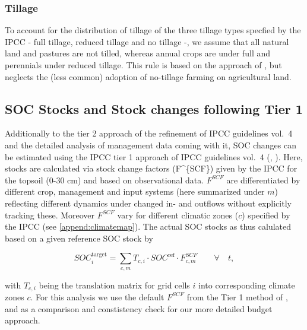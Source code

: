 \documentclass[gc, manuscript]{copernicus}
\begin{document}
\hypertarget{sec:tillage}{%
\subsubsection{Tillage}\label{sec:tillage}}

To account for the distribution of tillage of the three tillage types specfied by the IPCC - full tillage, reduced tillage and no tillage -, we assume that all natural land and pastures are not tilled, whereas annual crops are under full and perennials under reduced tillage. This rule is based on the approach of \citep{porwollik_generating_2018}, but neglects the (less common) adoption of no-tillage farming on agricultural land.

\newpage

\hypertarget{sec:tier1}{%
\subsection{SOC Stocks and Stock changes following Tier 1}\label{sec:tier1}}

Additionally to the tier 2 approach of the refinement of IPCC guidelines vol.~4 \citep{ipcc_2019_2019} and the detailed analysis of management data coming with it, SOC changes can be estimated using the IPCC tier 1 approach of IPCC guidelines vol.~4 (\citet{ipcc_2006_2006}, \citet{ipcc_2019_2019}). Here, stocks are calculated via stock change factors (F\^{}\{SCF\}) given by the IPCC for the topsoil (0-30 cm) and based on observational data. \(F^{SCF}\) are differentiated by different crop, management and input systems (here summarized under \(m\)) reflecting different dynamics under changed in- and outflows without explicitly tracking these. Moreover \(F^{SCF}\) vary for different climatic zones (\(c\)) specified by the IPCC (see \ref{append:climatemap}). The actual SOC stocks as thus calulated based on a given reference SOC stock by

\begin{equation}
SOC^{\text{target}}_{i} = \sum_{c,m} T_{c,i} \cdot SOC^{\text{ref}} \cdot F^{SCF}_{c,m} \qquad\forall\quad t,
\label{eq:tier1}
\end{equation}

with \(T_{c,i}\) being the translation matrix for grid cells \(i\) into corresponding climate zones \(c\). For this analysis we use the default \(F^{SCF}\) from the Tier 1 method of \citep{ipcc_2006_2006}, and \citep{ipcc_2019_2019} as a comparison and constistency check for our more detailed budget approach.
\newpage
\end{document}
